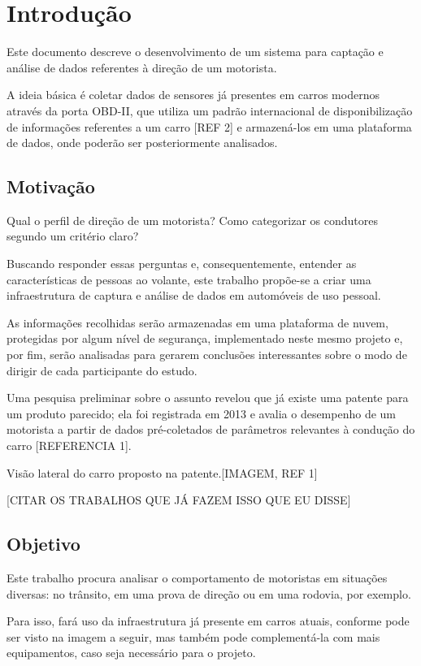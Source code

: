 \chapter{Introdução}\label{CAP:introducao}

Este documento descreve o desenvolvimento de um sistema para captação e análise de dados referentes à direção de um motorista.

A ideia básica é coletar dados de sensores já presentes em carros modernos através da porta OBD-II, que utiliza um padrão internacional de disponibilização de informações referentes a um carro [REF 2] e armazená-los em uma plataforma de dados, onde poderão ser posteriormente analisados.

\section{Motivação}

Qual o perfil de direção de um motorista? Como categorizar os condutores segundo um critério claro?

Buscando responder essas perguntas e, consequentemente, entender as características de pessoas ao volante, este trabalho propõe-se a criar uma infraestrutura de captura e análise de dados em automóveis de uso pessoal.

As informações recolhidas serão armazenadas em uma plataforma de nuvem, protegidas por algum nível de segurança, implementado neste mesmo projeto e, por fim, serão analisadas para gerarem conclusões interessantes sobre o modo de dirigir de cada participante do estudo.
	
Uma pesquisa preliminar sobre o assunto revelou que já existe uma patente para um produto parecido; ela foi registrada em 2013 e avalia o desempenho de um motorista a partir de dados pré-coletados de parâmetros relevantes à condução do carro [REFERENCIA 1].

Visão lateral do carro proposto na patente.[IMAGEM, REF 1]

[CITAR OS TRABALHOS QUE JÁ FAZEM ISSO QUE EU DISSE]

\section{Objetivo}

Este trabalho procura analisar o comportamento de motoristas em situações diversas: no trânsito, em uma prova de direção ou em uma rodovia, por exemplo.

Para isso, fará uso da infraestrutura já presente em carros atuais, conforme pode ser visto na imagem a seguir, mas também pode complementá-la com mais equipamentos, caso seja necessário para o projeto.


